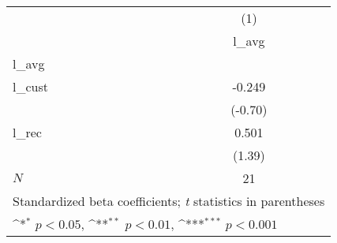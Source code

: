 {
\def\sym#1{\ifmmode^{#1}\else\(^{#1}\)\fi}
\begin{tabular}{l*{1}{c}}
\hline\hline
            &\multicolumn{1}{c}{(1)}\\
            &\multicolumn{1}{c}{l\_avg}\\
\hline
l\_avg       &                     \\
l\_cust      &      -0.249         \\
            &     (-0.70)         \\
[1em]
l\_rec       &       0.501         \\
            &      (1.39)         \\
\hline
\(N\)       &          21         \\
\hline\hline
\multicolumn{2}{l}{\footnotesize Standardized beta coefficients; \textit{t} statistics in parentheses}\\
\multicolumn{2}{l}{\footnotesize \sym{*} \(p<0.05\), \sym{**} \(p<0.01\), \sym{***} \(p<0.001\)}\\
\end{tabular}
}
